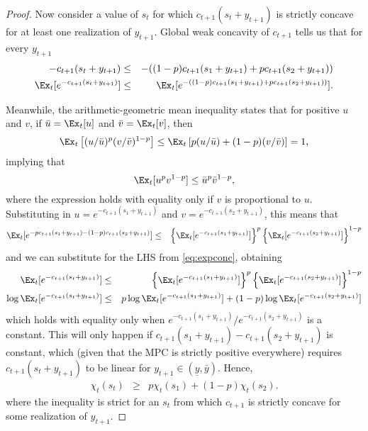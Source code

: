 \documentclass[titlepage]{\econtex}
\begin{document}
\begin{proof}
	Now consider a value of $s_{t}$ for which $c_{t+1}(s_{t}+{y}_{t+1})$ is strictly concave for at least one realization of ${y}_{t+1}$. Global weak concavity of $c_{t+1}$ tells us that for every ${y}_{t+1}$
	\begin{eqnarray}
	-c_{t+1}(s_{t}+{y}_{t+1}) & \leq & -((1-p)c_{t+1}(s_1+{y}_{t+1})+pc_{t+1}(s_{2}+{y}_{t+1})) \nonumber
	\\ \Ex_{t}[e^{-c_{t+1}(s_{t}+{y}_{t+1})}] & \leq & \Ex_{t}[e^{-((1-p)c_{t+1}(s_1+{y}_{t+1})+pc_{t+1}(s_{2}+{y}_{t+1}))}]. \label{eq:expconc}
	\end{eqnarray}
	
	Meanwhile, the arithmetic-geometric mean inequality states that for
	positive $u$ and $v$, if $\bar u = \Ex_t [ u]$ and $\bar v = \Ex_t [ v]$, then
	\begin{equation*}
	\Ex_t\left[( u/\bar u)^p ( v/\bar v)^{1-p}\right] 
	\leq \Ex_t \left[p ( u/\bar u)+(1-p)( v/\bar v)\right] = 1, 
	\end{equation*}
	implying that 
	\begin{equation*}
	\Ex_t [ u^p  v^{1-p}] \leq \bar u^p \bar v^{1-p}, 
	\end{equation*}
	where the expression holds with equality only if $v$ is proportional to $u$.  Substituting in $u= e^{-c_{t+1}(s_1 + {y}_{t+1})}$ and $v = e^{-c_{t+1}(s_2 + {y}_{t+1})}$, this means that
	\begin{eqnarray*}
	\Ex_t [e^{-p c_{t+1}(s_1 + {y}_{t+1}) - (1-p)c_{t+1}(s_2 + {y}_{t+1})}] & \leq &
	\left\{ \Ex_t  [e^{- c_{t+1}(s_1 + {y}_{t+1})} ] \right\}^p \left\{ \Ex_t  [e^{- c_{t+1}(s_2 + {y}_{t+1})} ] \right\}^{1-p}
	\end{eqnarray*}
	and we can substitute for the LHS from \eqref{eq:expconc}, obtaining
	\begin{eqnarray}
	\Ex_{t}[e^{-c_{t+1}(s_{t}+{y}_{t+1})}] & \leq &
	\left\{ \Ex_t  [e^{- c_{t+1}(s_1 + {y}_{t+1})} ] \right\}^p 	\left\{ \Ex_t  [e^{- c_{t+1}(s_2 + {y}_{t+1})} ] \right\}^{1-p} \nonumber
	\\ 
	\log \Ex_{t}[e^{-c_{t+1}(s_{t}+{y}_{t+1})}] &\leq &
	p \log \Ex_t  [e^{-c_{t+1}(s_1 + {y}_{t+1})} ] 
	+ (1-p) \log \Ex_t  [e^{-c_{t+1}(s_2 + {y}_{t+1})} ]  \label{eq:expineq2} 
	\end{eqnarray}
	which holds with equality only when
	$e^{-c_{t+1}(s_{1}+{y}_{t+1})}/e^{-c_{t+1}(s_{2}+{y}_{t+1})}$ is a constant. This will only happen if
	$c_{t+1}(s_{1}+{y}_{t+1})-c_{t+1}(s_{2}+{y}_{t+1})$ is constant, which (given that the MPC is strictly positive everywhere) requires
	$c_{t+1}(s_{t}+{y}_{t+1})$ to be linear for ${y}_{t+1} \in
	(\underline{y},\bar{y})$. Hence, 
	\begin{eqnarray*}
	\chi_{t}(s_t) & \geq & p \chi_{t}(s_{1}) + (1-p) \chi_{t}(s_{2}).
	\end{eqnarray*}
	where the inequality is strict for an $s_{t}$ from which $c_{t+1}$ is strictly concave for some realization of ${y}_{t+1}$.
	

\end{proof}
\end{document}
